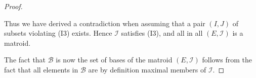 \begin{proof}
\begin{enumerate}
        Thus we have derived a contradiction when assuming that a pair $(I, J)$ of subsets violating (I3) exists. Hence $\mathcal{I}$ satisfies (I3), and all in all $(E,\mathcal{I})$ is a matroid.
    \end{enumerate}  

    
    The fact that $\mathcal{B}$ is now the set of bases of the matroid $(E,\mathcal{I})$ follows from the fact that all elements in $\mathcal{B}$ are by definition maximal members of $\mathcal{I}$.
\end{proof}

\newpage


\begin{exmp}
    
\end{exmp}



